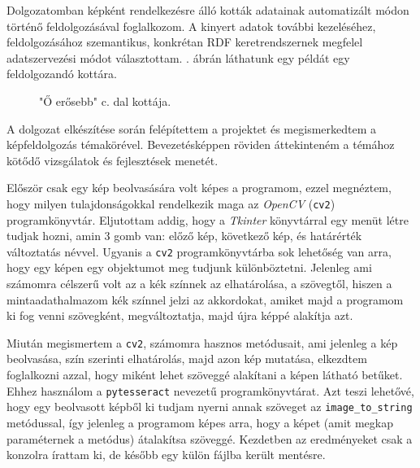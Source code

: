 
Dolgozatomban képként rendelkezésre álló kották adatainak automatizált módon történő feldolgozásával foglalkozom. A kinyert adatok további kezeléséhez, feldolgozásához szemantikus, konkrétan RDF keretrendszernek megfelel adatszervezési módot választottam. . ábrán láthatunk egy példát egy feldolgozandó kottára.

\begin{figure}[h]
	\caption{"Ő erősebb" c. dal kottája.}
	\label{fig:Dal1}
\end{figure}

A dolgozat elkészítése során felépítettem a projektet és megismerkedtem a képfeldolgozás témakörével. Bevezetésképpen röviden áttekinteném a témához kötődő vizsgálatok és fejlesztések menetét.

Először csak egy kép beolvasására volt képes a programom, ezzel megnéztem, hogy milyen tulajdonságokkal rendelkezik maga az \textit{OpenCV} (\texttt{cv2}) programkönyvtár. Eljutottam addig, hogy a \textit{Tkinter} könyvtárral egy menüt létre tudjak hozni, amin 3 gomb van: előző kép, következő kép, és határérték változtatás névvel. Ugyanis a \texttt{cv2} programkönyvtárba sok lehetőség van arra, hogy egy képen egy objektumot meg tudjunk különböztetni. Jelenleg ami számomra célszerű volt az a kék színnek az elhatárolása, a szövegtől, hiszen a mintaadathalmazom kék színnel jelzi az akkordokat, amiket majd a programom ki fog venni szövegként, megváltoztatja, majd újra képpé alakítja azt.

Miután megismertem a \texttt{cv2}, számomra hasznos metódusait, ami jelenleg a kép beolvasása, szín szerinti elhatárolás, majd azon kép mutatása, elkezdtem foglalkozni azzal, hogy miként lehet szöveggé alakítani a képen látható betűket. Ehhez használom a \texttt{pytesseract} nevezetű programkönyvtárat. Azt teszi lehetővé, hogy egy beolvasott képből ki tudjam nyerni annak szöveget az \texttt{image\_to\_string} metódussal, így jelenleg a programom képes arra, hogy a képet (amit megkap paraméternek a metódus) átalakítsa szöveggé. Kezdetben az eredményeket csak a konzolra írattam ki, de később egy külön fájlba került mentésre.


